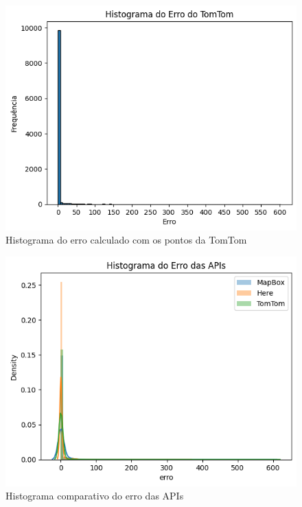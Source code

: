 \begin{figure}[h]
  \centering
  \includegraphics[width=\textwidth]{Figuras/hist3.png}
  \caption{Histograma do erro calculado com os pontos da TomTom}
  \label{fig:hist3}
\end{figure}

\begin{figure}[h]
  \centering
  \includegraphics[width=\textwidth]{Figuras/hist4.png}
  \caption{Histograma comparativo do erro das APIs}
  \label{fig:hist4}
\end{figure}

